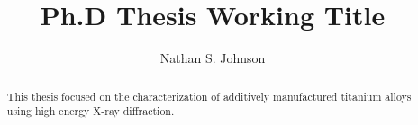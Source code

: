 \documentclass[letterpaper,12pt]{article}
\title{Ph.D Thesis Working Title}
\author{Nathan S. Johnson}
\begin{document}

\frontmatter

\maketitle
\newpage

\makecopyright{\the\year}
\newpage

\makesubmittal
\newpage

\begin{abstract}

This thesis focused on the characterization of additively manufactured titanium alloys using high energy X-ray diffraction.

\end{abstract}
\newpage

\tableofcontents
\newpage

\listoffiguresandtables
\newpage






\listofsymbols
\newpage
\end{document}

